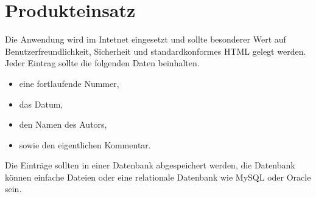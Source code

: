 \section{Produkteinsatz}
 
Die Anwendung wird im Intetnet eingesetzt und sollte besonderer Wert auf Benutzerfreundlichkeit, Sicherheit und
standardkonformes HTML gelegt werden. Jeder Eintrag sollte die folgenden Daten beinhalten.

\begin{itemize}
\item eine fortlaufende Nummer,
\item das Datum,
\item den Namen des Autors,
\item sowie den eigentlichen Kommentar.
\end{itemize}

Die Einträge sollten in einer Datenbank abgespeichert werden, die Datenbank
können einfache Dateien oder eine relationale Datenbank wie MySQL oder Oracle
sein.
